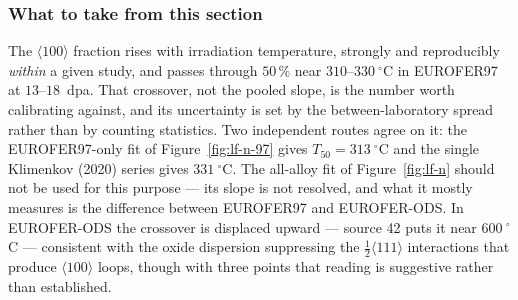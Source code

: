 \subsubsection*{What to take from this section}

The $\langle 100\rangle$ fraction rises with irradiation temperature, strongly and
reproducibly \emph{within} a given study, and passes through $50\,\%$ near
$310$--$330~^{\circ}$C in EUROFER97 at $13$--$18$~dpa. That crossover, not the pooled
slope, is the number worth calibrating against, and its uncertainty is set by the
between-laboratory spread rather than by counting statistics. Two independent routes
agree on it: the EUROFER97-only fit of Figure~\ref{fig:lf-n-97} gives
$T_{50} = 313~^{\circ}$C and the single Klimenkov (2020) series gives
$331~^{\circ}$C. The all-alloy fit of Figure~\ref{fig:lf-n} should not be used for
this purpose --- its slope is not resolved, and what it mostly measures is the
difference between EUROFER97 and EUROFER-ODS. In EUROFER-ODS the
crossover is displaced upward --- source 42 puts it near $600~^{\circ}$C --- consistent
with the oxide dispersion suppressing the $\frac{1}{2}\langle 111\rangle$ interactions
that produce $\langle 100\rangle$ loops, though with three points that reading is
suggestive rather than established.

